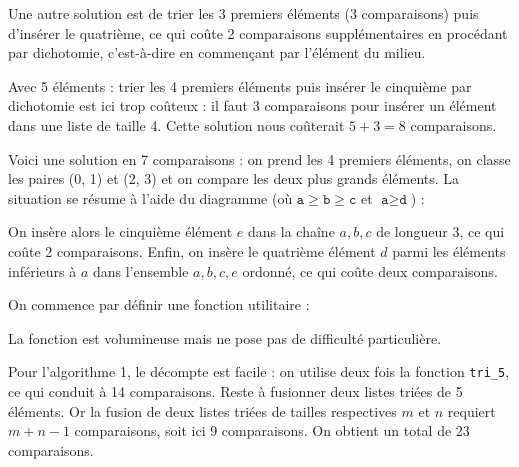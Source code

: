 Une autre solution est de trier les 3 premiers éléments (3 comparaisons) puis d'insérer le quatrième, ce qui coûte 2 comparaisons supplémentaires en procédant par dichotomie, c'est-à-dire en commençant par l'élément du milieu.
\medskip

Avec 5 éléments : trier les 4 premiers éléments puis insérer le cinquième par dichotomie est ici trop coûteux : il faut 3 comparaisons pour insérer un élément dans une liste de taille 4. Cette solution nous coûterait $5+3=8$ comparaisons.
\medskip

Voici une solution en 7 comparaisons : on prend les 4 premiers éléments, on classe les paires (0, 1) et (2, 3) et on compare les deux plus grands éléments. La situation se résume à l'aide du diagramme (où $\texttt{a}\geq\texttt{b}\geq\texttt{c}$ et $\texttt{a}\geq\texttt{d}$) :

\begin{center}
\end{center}

On insère alors le cinquième élément $e$ dans la chaîne $a,b,c$ de longueur 3, ce qui coûte 2 comparaisons. Enfin, on insère le quatrième élément $d$ parmi les éléments inférieurs à $a$ dans l'ensemble $a,b,c,e$ ordonné, ce qui coûte deux comparaisons.
\medskip

On commence par définir une fonction utilitaire :



La fonction est volumineuse mais ne pose pas de difficulté particulière.

\Q
Pour l'algorithme 1, le décompte est facile : on utilise deux fois la fonction \texttt{tri\_5}, ce qui conduit à 14 comparaisons. Reste à fusionner deux listes triées de 5 éléments. Or la fusion de deux listes triées de tailles respectives $m$ et $n$ requiert $m+n-1$ comparaisons, soit ici 9 comparaisons. On obtient un total de 23 comparaisons.
\medskip

